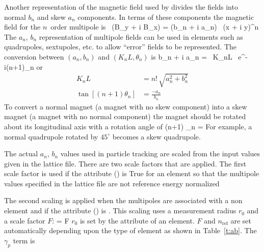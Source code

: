 Another representation of the magnetic field used by \bmad divides
the fields into normal $b_n$ and skew $a_n$ components. In terms of
these components the magnetic field for the $n$\Th\ order multipole is
\Begineq
   \, (B_y + i B_x) = (b_n + i a_n) \, (x + i y)^n
  \label{qlpbb}
\Endeq
The $a_n$, $b_n$ representation of multipole fields can be used in elements such as
quadrupoles, sextupoles, etc. to allow ``error'' fields to be represented.  
The conversion between $(a_n, b_n)$ and $(K_nL, \theta_n)$ is
\Begineq
  b_n + i a_n =  \, K_nL \, e^{-i(n+1)\theta_n}
\Endeq
or
\begin{align}
  K_n L &= n! \, \sqrt{a_n^2 + b_n^2} \\
  \tan[(n+1) \theta_n] &= \frac{-a_n}{b_n}
\end{align}
To convert a normal magnet (a magnet with no skew component) into a skew
magnet (a magnet with no normal component) the magnet should be rotated
about its longitudinal axis with a rotation angle of
\Begineq
  (n+1) \theta_n = 
\Endeq
For example, a normal quadrupole rotated by $45^\circ$ becomes a
skew quadrupole.

The actual $a_n$, $b_n$ values used in particle tracking are scaled from the input values
given in the lattice file. There are two scale factors that are applied. The first scale
factor is used if the  attribute () is True for an
element so that the multipole values specified in the lattice file are not reference
energy normalized
\Begineq
  \bigl[ a_n, b_n \bigr] \longrightarrow
  \bigl[ a_n, b_n \bigr] \cdot {}
  \label{ababq}
\Endeq

The second scaling is applied when the multipoles are associated with a non
 element and if the  attribute () is
. This scaling uses a measurement radius $r_0$ and a scale factor $F$:
\Begineq
  \bigl[ a_n, b_n \bigr] =
  \bigl[ a_n, b_n \bigr]
  \cdot F \cdot {}
  \label{ababf}
\Endeq
$r_0$ is set by the  attribute of an element. $F$ and $n_\text{ref}$ are set
automatically depending upon the type of element as shown in Table~\ref{t:ab}. The
$\gamma_p$ term is

